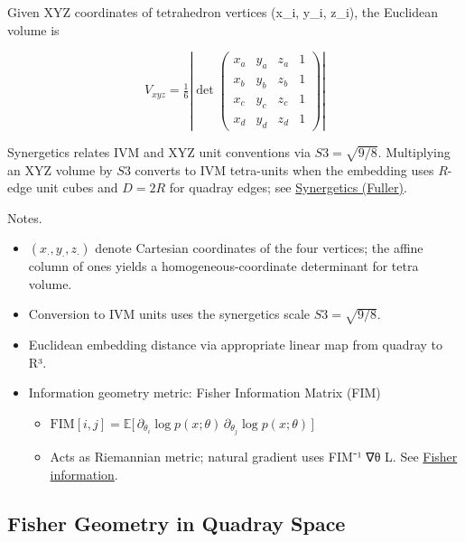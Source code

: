 \documentclass[
  10pt,
]{article}
\providecommand{\tightlist}{%
  \setlength{\itemsep}{0pt}\setlength{\parskip}{0pt}}
\begin{document}
Given XYZ coordinates of tetrahedron vertices (x\_i, y\_i, z\_i), the
Euclidean volume is

\begin{equation}\label{eq:xyz_det}
V_{xyz} = \tfrac{1}{6} \left| \det \begin{pmatrix}
 x_a & y_a & z_a & 1 \\
 x_b & y_b & z_b & 1 \\
 x_c & y_c & z_c & 1 \\
 x_d & y_d & z_d & 1
\end{pmatrix} \right|
\end{equation}

Synergetics relates IVM and XYZ unit conventions via
\(S3 = \sqrt{9/8}\). Multiplying an XYZ volume by \(S3\) converts to IVM
tetra-units when the embedding uses \(R\)-edge unit cubes and \(D=2R\)
for quadray edges; see
\href{https://en.wikipedia.org/wiki/Synergetics_(Fuller)}{Synergetics
(Fuller)}.

Notes.

\begin{itemize}
\item
  \((x_\cdot,y_\cdot,z_\cdot)\) denote Cartesian coordinates of the four
  vertices; the affine column of ones yields a homogeneous-coordinate
  determinant for tetra volume.
\item
  Conversion to IVM units uses the synergetics scale \(S3=\sqrt{9/8}\).
\item
  Euclidean embedding distance via appropriate linear map from quadray
  to R³.
\item
  Information geometry metric: Fisher Information Matrix (FIM)

  \begin{itemize}
  \tightlist
  \item
    \(\mathrm{FIM}[i,j] = \mathbb{E}\big[\, \partial_{\theta_i} \log p(x;\theta)\,\partial_{\theta_j} \log p(x;\theta)\,\big]\)
  \item
    Acts as Riemannian metric; natural gradient uses FIM⁻¹ ∇θ L. See
    \href{https://en.wikipedia.org/wiki/Fisher_information}{Fisher
    information}.
  \end{itemize}
\end{itemize}

\hypertarget{fisher-geometry-in-quadray-space}{%
\subsection{Fisher Geometry in Quadray
Space}\label{fisher-geometry-in-quadray-space}}
\end{document}
